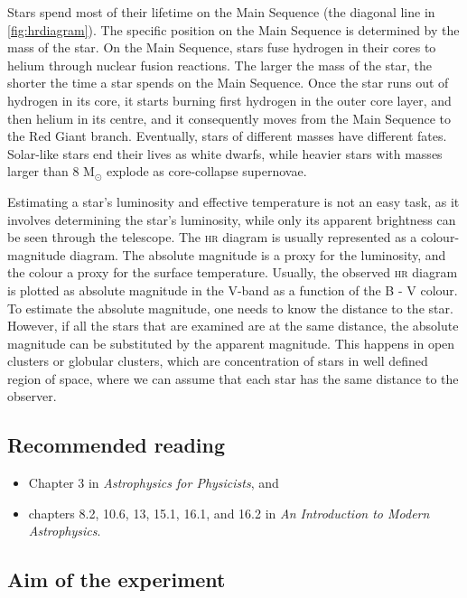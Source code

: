 \documentclass[a4paper, 11pt, fleqn]{memoir}
\begin{document}
Stars spend most of their lifetime on the Main Sequence (the diagonal line in \cref{fig:hrdiagram}).
The specific position on the Main Sequence is determined by the mass of the star.
On the Main Sequence, stars fuse hydrogen in their cores to helium through nuclear fusion reactions.
The larger the mass of the star, the shorter the time a star spends on the Main Sequence.
Once the star runs out of hydrogen in its core, it starts burning first hydrogen in the outer core layer, and then helium in its centre, and it consequently moves from the Main Sequence to the Red Giant branch.
Eventually, stars of different masses have different fates.
Solar-like stars end their lives as white dwarfs, while heavier stars with masses larger than 8 M$_{\odot}$
explode as core-collapse supernovae.

Estimating a star's luminosity and effective temperature is not an easy task, as it involves determining the star's luminosity, while only its apparent brightness can be seen through the telescope.
The \textsc{hr} diagram is usually represented as a colour-magnitude diagram.
The absolute magnitude is a proxy for the luminosity, and the colour a proxy for the surface temperature.
Usually, the observed \textsc{hr} diagram is plotted as absolute magnitude in the V-band as a function of the B - V colour.
To estimate the absolute magnitude, one needs to know the distance to the star.
However, if all the stars that are examined are at the same distance, the absolute magnitude can be substituted by the apparent magnitude.
This happens in open clusters or globular clusters, which are concentration of stars in well defined region of space, where we can assume that each star has the same distance to the observer.

\subsection{Recommended reading}

\begin{itemize}
    \item Chapter 3 in \emph{Astrophysics for Physicists}\autocite{Choudhuri}, and
    \item chapters 8.2, 10.6, 13, 15.1, 16.1, and 16.2 in \emph{An Introduction to Modern Astrophysics}\autocite{carroll2017introduction}.
\end{itemize}


\subsection{Aim of the experiment}
\end{document}
